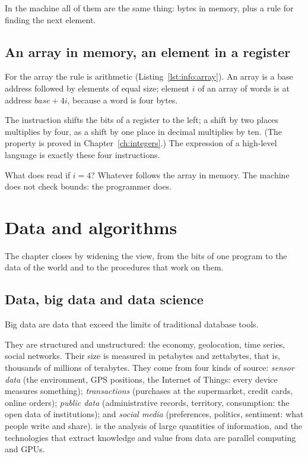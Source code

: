 In the machine all of them are the same thing: bytes in memory, plus a rule
for finding the next element.

\subsection{An array in memory, an element in a register}

For the array the rule is arithmetic (Listing~\ref{lst:info:array}). An array
is a base address followed by elements of equal size; element $i$ of an array
of words is at address $\mathit{base}+4i$, because a word is four bytes.


The instruction  shifts the bits of a register to the left; a shift
by two places multiplies by four, as a shift by one place in decimal
multiplies by ten. (The property is proved in Chapter~\ref{ch:integers}.)
The expression  of a high-level language is exactly these four
instructions.

\begin{prgwarn}
What does  read if $i=4$? Whatever follows the array in memory. The
machine does not check bounds: the programmer does.
\end{prgwarn}

\section{Data and algorithms}

The chapter closes by widening the view, from the bits of one program to the
data of the world and to the procedures that work on them.

\subsection{Data, big data and data science}

\begin{definition}{Big data}
 are data that exceed the limits of traditional database tools.
\end{definition}

They are structured and unstructured: the economy, geolocation, time series,
social networks. Their size is measured in petabytes and zettabytes, that is,
thousands of millions of terabytes. They come from four kinds of source:
\emph{sensor data} (the environment, GPS positions, the Internet of Things:
every device measures something); \emph{transactions} (purchases at the
supermarket, credit cards, online orders); \emph{public data} (administrative
records, territory, consumption: the open data of institutions); and
\emph{social media} (preferences, politics, sentiment: what people write and
share).  is the analysis of large quantities of
information, and the technologies that extract knowledge and value from data
are parallel computing and GPUs.

